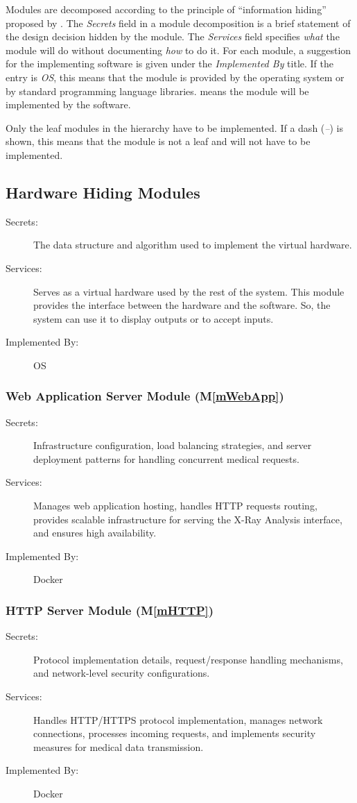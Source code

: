 \documentclass[12pt, titlepage]{article}
\newcommand{\mref}[1]{M\ref{#1}}
\begin{document}
Modules are decomposed according to the principle of ``information hiding''
proposed by \citet{ParnasEtAl1984}. The \emph{Secrets} field in a module
decomposition is a brief statement of the design decision hidden by the
module. The \emph{Services} field specifies \emph{what} the module will do
without documenting \emph{how} to do it. For each module, a suggestion for the
implementing software is given under the \emph{Implemented By} title. If the
entry is \emph{OS}, this means that the module is provided by the operating
system or by standard programming language libraries.  \emph{\progname{}} means the
module will be implemented by the \progname{} software.

Only the leaf modules in the hierarchy have to be implemented. If a dash
(\emph{--}) is shown, this means that the module is not a leaf and will not have
to be implemented.

\subsection{Hardware Hiding Modules}

\begin{description}
\item[Secrets:]The data structure and algorithm used to implement the virtual
  hardware.
\item[Services:]Serves as a virtual hardware used by the rest of the
  system. This module provides the interface between the hardware and the
  software. So, the system can use it to display outputs or to accept inputs.
\item[Implemented By:] OS
\end{description}
\subsubsection{Web Application Server Module (\mref{mWebApp})}
\begin{description}
\item[Secrets:] Infrastructure configuration, load balancing strategies, and server deployment patterns for handling concurrent medical requests.
\item[Services:] Manages web application hosting, handles HTTP requests routing, provides scalable infrastructure for serving the X-Ray Analysis interface, and ensures high availability.
\item[Implemented By:] Docker
\end{description}
\subsubsection{HTTP Server Module (\mref{mHTTP})}
\begin{description}
\item[Secrets:] Protocol implementation details, request/response handling mechanisms, and network-level security configurations.
\item[Services:] Handles HTTP/HTTPS protocol implementation, manages network connections, processes incoming requests, and implements security measures for medical data transmission.
\item[Implemented By:] Docker
\end{description}
\end{document}
